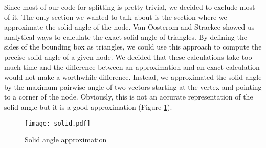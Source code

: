 Since most of our code for splitting is pretty trivial, we decided to exclude most of it. The only section we wanted to talk about is the section where we approximate the solid angle of the node. Van Oosterom and Strackee \cite{SAPT} showed us analytical ways to calculate the exact solid angle of triangles. By defining the sides of the bounding box as triangles, we could use this approach to compute the precise solid angle of a given node. We decided that these calculations take too much time and the difference between an approximation and an exact calculation would not make a worthwhile difference. Instead, we approximated the solid angle by the maximum pairwise angle of two vectors starting at the vertex and pointing to a corner of the node. Obviously, this is not an accurate representation of the solid angle but it is a good approximation (Figure \ref{fig:solid}).

\begin{figure}
	\begin{center}
		\texttt{[image: solid.pdf]}
		\caption{Solid angle approximation}
		\label{fig:solid}
	\end{center}
\end{figure}
